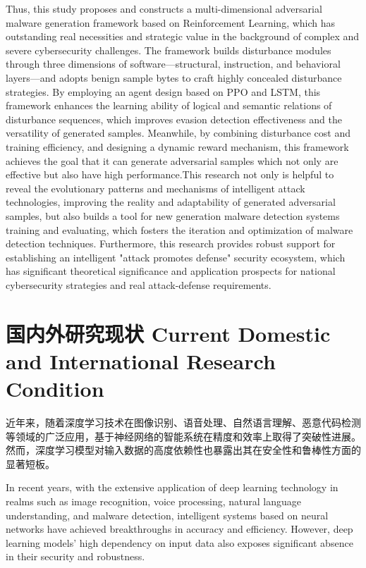 Thus, this study proposes and constructs a multi-dimensional adversarial malware generation framework based on Reinforcement Learning, which has outstanding real necessities and strategic value in the background of complex and severe cybersecurity challenges. The framework builds disturbance modules through three dimensions of software—structural, instruction, and behavioral layers—and adopts benign sample bytes to craft highly concealed disturbance strategies. By employing an agent design based on PPO and LSTM, this framework enhances the learning ability of logical and semantic relations of disturbance sequences, which improves evasion detection effectiveness and the versatility of generated samples. Meanwhile, by combining disturbance cost and training efficiency, and designing a dynamic reward mechanism, this framework achieves the goal that it can generate adversarial samples which not only are effective but also have high performance.This research not only is helpful to reveal the evolutionary patterns and mechanisms of intelligent attack technologies, improving the reality and adaptability of generated adversarial samples, but also builds a tool for new generation malware detection systems training and evaluating, which fosters the iteration and optimization of malware detection techniques. Furthermore, this research provides robust support for establishing an intelligent "attack promotes defense" security ecosystem, which has significant theoretical significance and application prospects for national cybersecurity strategies and real attack-defense requirements.

\section{国内外研究现状 Current Domestic and International Research Condition }
近年来，随着深度学习技术在图像识别、语音处理、自然语言理解、恶意代码检测等领域的广泛应用\cite{meng2022adavit,yang2022torchaudio,weld2022survey,lee2023classification}，基于神经网络的智能系统在精度和效率上取得了突破性进展。然而，深度学习模型对输入数据的高度依赖性也暴露出其在安全性和鲁棒性方面的显著短板。

In recent years, with the extensive application of deep learning technology in realms such as image recognition\cite{meng2022adavit,yang2022torchaudio,weld2022survey,lee2023classification}, voice processing, natural language understanding, and malware detection, intelligent systems based on neural networks have achieved breakthroughs in accuracy and efficiency. However, deep learning models’ high dependency on input data also exposes significant absence in their security and robustness.

